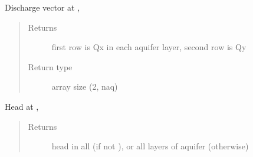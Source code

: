\documentclass[letterpaper,10pt,english]{sphinxmanual}
\begin{document}
\begin{fulllineitems}
\begin{sphinxVerbatim}[commandchars=\\\{\}]
   
  \PYG{p}{[}  \PYG{p}{]} \PYG{p}{[} \PYG{p}{]}              \PYG{p}{[}    \PYG{p}{]}                 \PYG{p}{[}   \PYG{p}{]}
\end{sphinxVerbatim}

\begin{fulllineitems}
\label{\detokenize{models/model:timml.model.Model.disvec}}
Discharge vector at , 
\begin{quote}\begin{description}
\item[{Returns}] \leavevmode
{} \textendash{} first row is Qx in each aquifer layer, second row is Qy

\item[{Return type}] \leavevmode
array size (2, naq)

\end{description}\end{quote}

\end{fulllineitems}


\begin{fulllineitems}
\label{\detokenize{models/model:timml.model.Model.head}}
Head at , 
\begin{quote}\begin{description}
\item[{Returns}] \leavevmode
{} \textendash{} head in all  (if not ), or all layers of aquifer (otherwise)


\end{description}
\end{quote}
\end{fulllineitems}
\end{fulllineitems}
\end{document}
